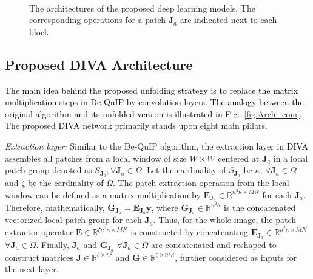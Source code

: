 \documentclass[10pt,journal,compsoc]{IEEEtran}
\newcommand{\dk}{\textcolor{black}}
\def\bsy{{\boldsymbol{y}}}
\def\bsJ{{\boldsymbol{J}}}
\def\bsE{{\boldsymbol{E}}}
\def\bsG{{\boldsymbol{G}}}
\begin{document}
\begin{figure*}[h!]
\begin{centering}

\\ %

\end{centering}
\caption{The architectures of the proposed deep learning models. The corresponding operations for a patch $\bsJ_a$ are indicated next to each block.}
\label{fig:deep_model_layers}
\end{figure*}







\subsection{Proposed DIVA Architecture}
\label{sec:deep_dequip}
\dk{The main idea behind the proposed unfolding strategy is to replace the matrix multiplication steps in De-QuIP by convolution layers. The analogy between the original algorithm and its unfolded version is illustrated in Fig.~\ref{fig:Arch_com}.}
The proposed \dk{DIVA} network primarily stands upon eight main pillars.

\textit{Extraction layer:}
Similar to the De-QuIP algorithm, the extraction layer in \dk{DIVA} assembles all patches from a local window of size $W \times W$ centered at $\bsJ_a$ in a local patch-group denoted as $S_{\bsJ_a}, \forall \bsJ_a \in \Omega$. Let the cardinality of $S_{\bsJ_a}$ be $\kappa$, $\forall \bsJ_a \in \Omega$ and $\zeta$ be the cardinality of $\Omega$. The patch extraction operation from the local window can be defined as a matrix multiplication by $\bsE_{\bsJ_a} \in \mathbb{R}^{n^2 \kappa \times MN}$ for each $\bsJ_a$. Therefore, mathematically, $ \bsG_{\bsJ_a} = \bsE_{\bsJ_a} \bsy$, where $\bsG_{\bsJ_a} \in \mathbb{R}^{n^2 \kappa}$ is the concatenated vectorized local patch group for each $\bsJ_a$. Thus, for the whole image, the patch extractor operator $\bsE \in \mathbb{R}^{\zeta n^2 \kappa \times MN}$ is constructed by concatenating $\bsE_{\bsJ_a} \in \mathbb{R}^{n^2 \kappa \times MN}$ $\forall \bsJ_a \in \Omega$. Finally, $\bsJ_a$ and $\bsG_{\bsJ_a}$ $\forall \bsJ_a \in \Omega$ are concatenated and reshaped to construct matrices $\bsJ \in \mathbb{R}^{\zeta \times n^2}$ and $\bsG \in \mathbb{R}^{\zeta \times n^2 \kappa}$, further considered as inputs for the next layer.
\end{document}
